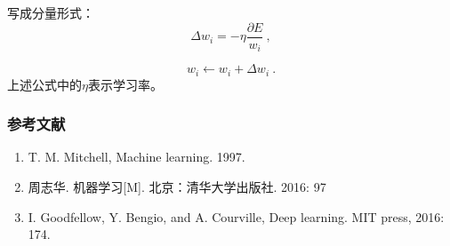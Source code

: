 写成分量形式：
\begin{equation}
\Delta w_i = - \eta \frac{\partial E}{w_i}~,
\end{equation}

\begin{equation}
w_i \leftarrow w_i + \Delta w_i~.
\end{equation}
上述公式中的$\eta$表示学习率。




\subsubsection{参考文献}
\begin{enumerate}
\item T. M. Mitchell, Machine learning. 1997.
\item 周志华. 机器学习[M]. 北京：清华大学出版社. 2016: 97
\item I. Goodfellow, Y. Bengio, and A. Courville, Deep learning. MIT press, 2016: 174.
\end{enumerate}